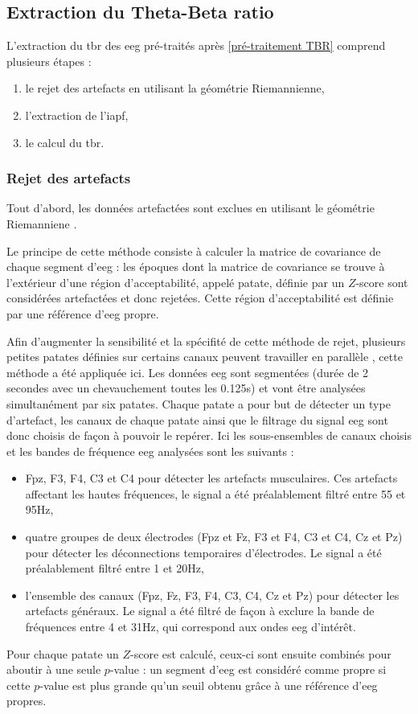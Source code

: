 \subsection{Extraction du Theta-Beta ratio} \label{extraction_tbr}
L'extraction du \gls{tbr} des \gls{eeg} pré-traités après \ref{pré-traitement TBR} comprend plusieurs étapes :
\begin{enumerate}
\item le rejet des artefacts en utilisant la géométrie Riemannienne,
\item l'extraction de l'\gls{iapf},
\item le calcul du \gls{tbr}.
\end{enumerate}

\subsubsection{Rejet des artefacts}
Tout d'abord, les données artefactées sont exclues en utilisant le géométrie Riemanniene \citep{Barachant2013, Barthelemy2019}. 

Le principe de cette méthode consiste à calculer la matrice de covariance de chaque segment d'\gls{eeg} : les époques dont la matrice de covariance se trouve à l'extérieur d'une région
d'acceptabilité, appelé patate, définie par un $Z$-score sont considérées artefactées et donc rejetées. Cette région d'acceptabilité est définie par une référence d'\gls{eeg} propre.

Afin d'augmenter la sensibilité et la spécifité de cette méthode de rejet, plusieurs petites patates définies sur certains canaux peuvent travailler en parallèle \citep{Barthelemy2019}, 
cette méthode a été appliquée ici.
Les données \gls{eeg} sont segmentées (durée de 2 secondes avec un chevauchement toutes les 0.125s) et vont être analysées simultanément par six patates. Chaque patate a pour but de détecter 
un type d'artefact, les canaux de chaque patate ainsi que le filtrage du signal \gls{eeg} sont donc choisis de façon à pouvoir le repérer. 
Ici les sous-ensembles de canaux choisis et les bandes de fréquence \gls{eeg} analysées sont les suivants :
\begin{itemize}
\item Fpz, F3, F4, C3 et C4 pour détecter les artefacts musculaires. Ces artefacts affectant les hautes fréquences, le signal a été préalablement filtré entre 55 et 95Hz,
\item quatre groupes de deux électrodes (Fpz et Fz, F3 et F4, C3 et C4, Cz et Pz) pour détecter les déconnections temporaires d'électrodes. Le signal a été préalablement filtré entre 1 et 20Hz, 
\item l'ensemble des canaux (Fpz, Fz, F3, F4, C3, C4, Cz et Pz) pour détecter les artefacts généraux. Le signal a été filtré de façon à exclure la bande de fréquences entre 4 et 31Hz, qui correspond
aux ondes \gls{eeg} d'intérêt.
\end{itemize}
Pour chaque patate un $Z$-score est calculé, ceux-ci sont ensuite combinés pour aboutir à une seule $p$-value : un segment d'\gls{eeg} est considéré comme propre si cette $p$-value est 
plus grande qu'un seuil obtenu grâce à une référence d'\gls{eeg} propres. 

